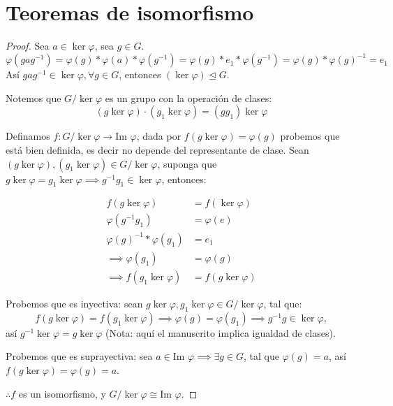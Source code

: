 \section{Teoremas de isomorfismo}%
\label{sec:Teoremas de isomorfismo}



\begin{proof}

	Sea $a \in \ker \varphi$, sea $g \in G$.
	\begin{equation*}
		\varphi(gag^{-1}) = \varphi(g) * \varphi(a) * \varphi(g^{-1}) = \varphi(g) * e_1 * \varphi(g^{-1}) = \varphi(g) * \varphi(g)^{-1} = e_1
	\end{equation*}
	Así $gag^{-1} \in \ker \varphi, \forall g \in G$, entonces $(\ker \varphi) \trianglelefteq G$.

	Notemos que $G/\ker \varphi$ es un grupo con la operación de clases:
	\begin{equation*}
		(g \ker \varphi) \cdot (g_1 \ker \varphi) = (g g_1) \ker \varphi
	\end{equation*}

	Definamos $f: G/\ker \varphi \to \text{Im } \varphi$, dada por $f(g \ker \varphi) = \varphi(g)$ probemos que está bien definida, es decir no depende del representante de clase. Sean $(g \ker \varphi), (g_1 \ker \varphi) \in G/\ker \varphi$, suponga que $g \ker \varphi = g_1 \ker \varphi \implies g^{-1}g_1 \in \ker \varphi$, entonces:

	\begin{align*}
		f(g \ker \varphi)              & = f(\ker \varphi)   \\
		\varphi(g^{-1}g_1)             & = \varphi(e)        \\
		\varphi(g)^{-1} * \varphi(g_1) & = e_1               \\
		\implies \varphi(g_1)          & = \varphi(g)        \\
		\implies f(g_1 \ker \varphi)   & = f(g \ker \varphi)
	\end{align*}

	Probemos que es inyectiva: sean $g \ker \varphi, g_1 \ker \varphi \in G/\ker \varphi$, tal que:
	\begin{equation*}
		f(g \ker \varphi) = f(g_1 \ker \varphi) \implies \varphi(g) = \varphi(g_1) \implies g^{-1}g \in \ker \varphi,
	\end{equation*}
	así $g^{-1} \ker \varphi = g \ker \varphi$ (Nota: aquí el manuscrito implica igualdad de clases).

	Probemos que es suprayectiva: sea $a \in \text{Im } \varphi \implies \exists g \in G$, tal que $\varphi(g) = a$, así $f(g \ker \varphi) = \varphi(g) = a$.

	$\therefore f$ es un isomorfismo, y $G/\ker \varphi \cong \text{Im } \varphi$.
\end{proof}

